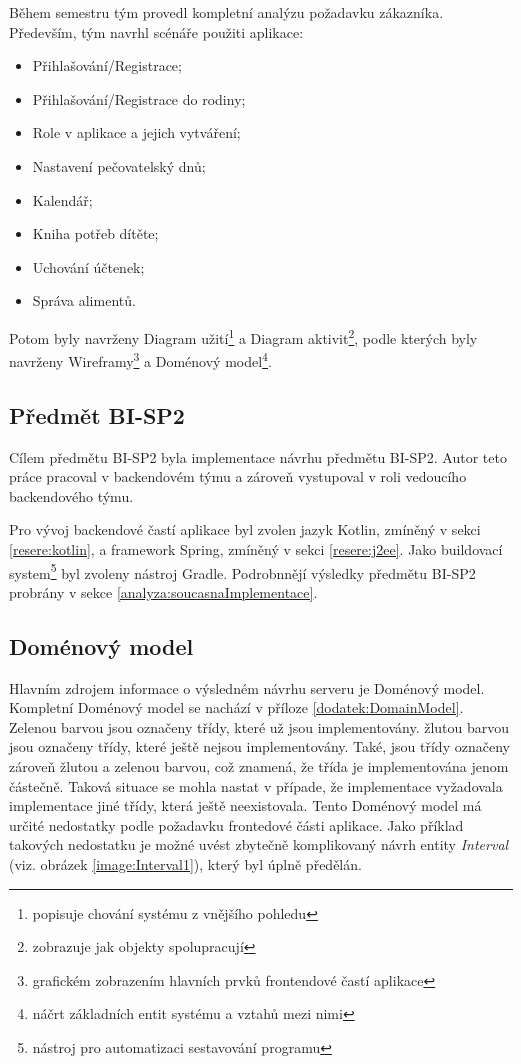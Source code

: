     Během semestru tým provedl kompletní analýzu požadavku zákazníka. Především, tým navrhl scénáře použiti aplikace:
    \begin{itemize}
	   \item Přihlašování/Registrace;
	   \item Přihlašování/Registrace do rodiny;
	   \item Role v aplikace a jejich vytváření;
	   \item Nastavení pečovatelský dnů;
	   \item Kalendář;
	   \item Kniha potřeb dítěte;
	   \item Uchování účtenek;
	   \item Správa alimentů.
	\end{itemize}
    Potom byly navrženy Diagram užití\footnote{popisuje chování systému z vnějšího pohledu} a Diagram aktivit\footnote{zobrazuje jak objekty spolupracují}, podle kterých byly navrženy Wireframy\footnote{grafickém zobrazením hlavních prvků frontendové častí aplikace} a Doménový model\footnote{náčrt základních entit systému a vztahů mezi nimi}. 
    
    \subsection{Předmět BI-SP2}\label{analyza:navrh:sp2}
        Cílem předmětu BI-SP2 byla implementace návrhu předmětu BI-SP2. Autor teto práce pracoval v backendovém týmu a zároveň vystupoval v roli vedoucího backendového týmu.
        
        Pro vývoj backendové častí aplikace byl zvolen jazyk Kotlin, zmíněný v sekci \ref{resere:kotlin}, a framework Spring, zmíněný v sekci \ref{resere:j2ee}. Jako {buildovací system}\footnote{nástroj pro automatizaci sestavování programu} byl zvoleny nástroj Gradle. Podrobnnějí výsledky předmětu BI-SP2 probrány v sekce \ref{analyza:soucasnaImplementace}.
        
    
    \subsection{Doménový model}\label{analyza:navrh:DomainModel}
        Hlavním zdrojem informace o výsledném návrhu serveru je Doménový model. Kompletní Doménový model se nachází v příloze \ref{dodatek:DomainModel}. Zelenou barvou jsou označeny třídy, které už jsou implementovány. žlutou barvou jsou označeny třídy, které ještě nejsou implementovány. Také, jsou třídy označeny zároveň žlutou a zelenou barvou, což znamená, že třída je implementována jenom částečně. Taková situace se mohla nastat v případe, že implementace vyžadovala implementace jiné třídy, která ještě neexistovala. Tento Doménový model má určité nedostatky podle požadavku frontedové části aplikace. Jako příklad takových nedostatku je možné uvést zbytečně komplikovaný návrh entity \textit{Interval} (viz. obrázek \ref{image:Interval1}), který byl úplně předělán.

